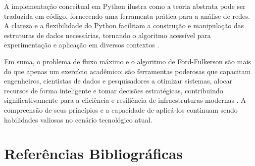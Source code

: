 \documentclass[12pt]{article}
\begin{document}
\noindent A implementação conceitual em Python ilustra como a teoria abstrata pode ser traduzida em código, fornecendo uma ferramenta prática para a análise de redes. A clareza e a flexibilidade do Python facilitam a construção e manipulação das estruturas de dados necessárias, tornando o algoritmo acessível para experimentação e aplicação em diversos contextos \cite{rossum2009python}.

\noindent Em suma, o problema de fluxo máximo e o algoritmo de Ford-Fulkerson são mais do que apenas um exercício acadêmico; são ferramentas poderosas que capacitam engenheiros, cientistas de dados e pesquisadores a otimizar sistemas, alocar recursos de forma inteligente e tomar decisões estratégicas, contribuindo significativamente para a eficiência e resiliência de infraestruturas modernas \cite{kleinberg2006}. A compreensão de seus princípios e a capacidade de aplicá-los continuam sendo habilidades valiosas no cenário tecnológico atual.




\newpage
\section{Referências Bibliográficas}



\end{document}
